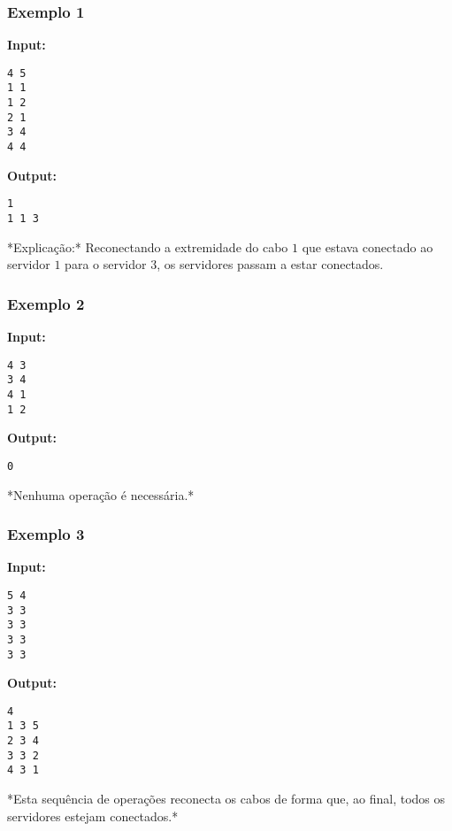 \subsubsection*{Exemplo 1}
\textbf{Input:}
\begin{verbatim}
4 5
1 1
1 2
2 1
3 4
4 4
\end{verbatim}

\textbf{Output:}
\begin{verbatim}
1
1 1 3
\end{verbatim}

*Explicação:* Reconectando a extremidade do cabo \(1\) que estava conectado ao servidor \(1\) para o servidor \(3\), os servidores passam a estar conectados.

\subsubsection*{Exemplo 2}
\textbf{Input:}
\begin{verbatim}
4 3
3 4
4 1
1 2
\end{verbatim}

\textbf{Output:}
\begin{verbatim}
0
\end{verbatim}

*Nenhuma operação é necessária.*

\subsubsection*{Exemplo 3}
\textbf{Input:}
\begin{verbatim}
5 4
3 3
3 3
3 3
3 3
\end{verbatim}

\textbf{Output:}
\begin{verbatim}
4
1 3 5
2 3 4
3 3 2
4 3 1
\end{verbatim}

*Esta sequência de operações reconecta os cabos de forma que, ao final, todos os servidores estejam conectados.*


